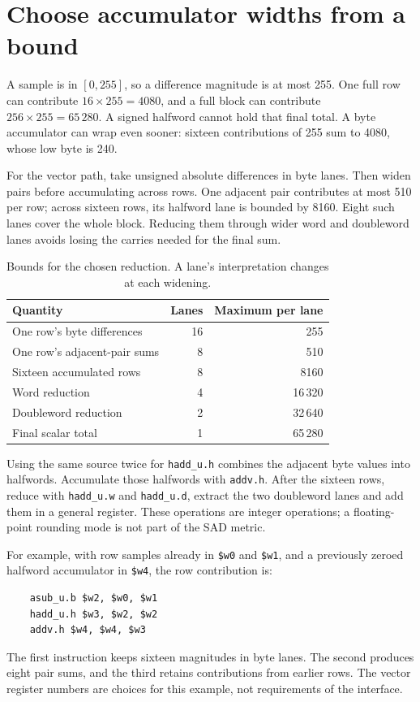 \section{Choose accumulator widths from a bound}
A sample is in $[0,255]$, so a difference magnitude is at most 255. One full row
can contribute $16\times255=4080$, and a full block can contribute
$256\times255=65\,280$. A signed halfword cannot hold that final total. A byte
accumulator can wrap even sooner: sixteen contributions of 255 sum to 4080,
whose low byte is 240.

For the vector path, take unsigned absolute differences in byte lanes. Then widen
pairs before accumulating across rows. One adjacent pair contributes at most 510
per row; across sixteen rows, its halfword lane is bounded by 8160. Eight such
lanes cover the whole block. Reducing them through wider word and doubleword
lanes avoids losing the carries needed for the final sum.

\begin{table}[htbp]
\centering
\caption{Bounds for the chosen reduction. A lane's interpretation changes at each widening.}
\begin{tabular}{lrr}
\toprule
Quantity & Lanes & Maximum per lane\\
\midrule
One row's byte differences & 16 & 255\\
One row's adjacent-pair sums & 8 & 510\\
Sixteen accumulated rows & 8 & 8160\\
Word reduction & 4 & 16\,320\\
Doubleword reduction & 2 & 32\,640\\
Final scalar total & 1 & 65\,280\\
\bottomrule
\end{tabular}
\end{table}

Using the same source twice for \texttt{hadd\_u.h} combines the adjacent byte
values into halfwords. Accumulate those halfwords with \texttt{addv.h}. After the
sixteen rows, reduce with \texttt{hadd\_u.w} and \texttt{hadd\_u.d}, extract the
two doubleword lanes and add them in a general register. These operations are
integer operations; a floating-point rounding mode is not part of the SAD metric.

For example, with row samples already in \texttt{\$w0} and \texttt{\$w1},
and a previously zeroed halfword accumulator in \texttt{\$w4}, the row contribution is:
\begin{verbatim}
    asub_u.b $w2, $w0, $w1
    hadd_u.h $w3, $w2, $w2
    addv.h $w4, $w4, $w3
\end{verbatim}
The first instruction keeps sixteen magnitudes in byte lanes. The second produces
eight pair sums, and the third retains contributions from earlier rows. The vector
register numbers are choices for this example, not requirements of the interface.

